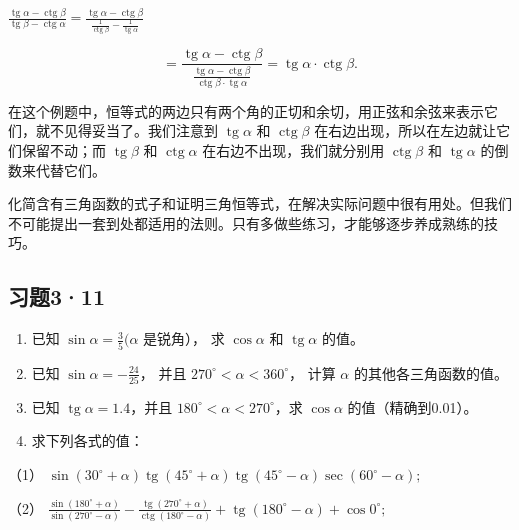 \(\frac{\operatorname{tg}\alpha - \operatorname{ctg}\beta}{\operatorname{tg}\beta - \operatorname{ctg}\alpha} = \frac{\operatorname{tg}\alpha - \operatorname{ctg}\beta}{\frac{1}{\operatorname{ctg}\beta} - \frac{1}{\operatorname{tg}\alpha}}\)

\[
= \frac {\operatorname{tg} \alpha - \operatorname{ctg} \beta}{\frac {\operatorname{tg} \alpha - \operatorname{ctg} \beta}{\operatorname{ctg} \beta \cdot \operatorname{tg} \alpha}} = \operatorname{tg} \alpha \cdot \operatorname{ctg} \beta .
\]

在这个例题中，恒等式的两边只有两个角的正切和余切，用正弦和余弦来表示它们，就不见得妥当了。我们注意到
\(\operatorname{tg} \alpha\) 和 \(\operatorname{ctg} \beta\)
在右边出现，所以在左边就让它们保留不动；而 \(\operatorname{tg} \beta\)
和 \(\operatorname{ctg} \alpha\) 在右边不出现，我们就分别用
\(\operatorname{ctg} \beta\) 和 \(\operatorname{tg} \alpha\)
的倒数来代替它们。

化简含有三角函数的式子和证明三角恒等式，在解决实际问题中很有用处。但我们不可能提出一套到处都适用的法则。只有多做些练习，才能够逐步养成熟练的技巧。

\subsection{习题3·11}

\begin{enumerate}
\item
  已知 \(\sin \alpha = \frac{3}{5} (\alpha\) 是锐角）， 求
  \(\cos \alpha\) 和 \(\operatorname{tg} \alpha\) 的值。
\item
  已知 \(\sin \alpha = -\frac{24}{25}\)， 并且
  \(270^{\circ} < \alpha < 360^{\circ}\)， 计算 \(\alpha\)
  的其他各三角函数的值。
\item
  已知 \(\operatorname{tg} \alpha = 1.4\)，并且
  \(180^{\circ} < \alpha < 270^{\circ}\)，求 \(\cos \alpha\)
  的值（精确到0.01）。
\item
  求下列各式的值：
\end{enumerate}

（1）
\(\sin (30^{\circ} + \alpha)\operatorname {tg}(45^{\circ} + \alpha)\operatorname {tg}(45^{\circ} - \alpha)\sec (60^{\circ} - \alpha);\)

（2）
\(\frac{\sin(180^{\circ} + \alpha)}{\sin(270^{\circ} - \alpha)} - \frac{\operatorname{tg}(270^{\circ} + \alpha)}{\operatorname{ctg}(180^{\circ} - \alpha)} + \operatorname{tg}(180^{\circ} - \alpha) + \cos 0^{\circ};\)

